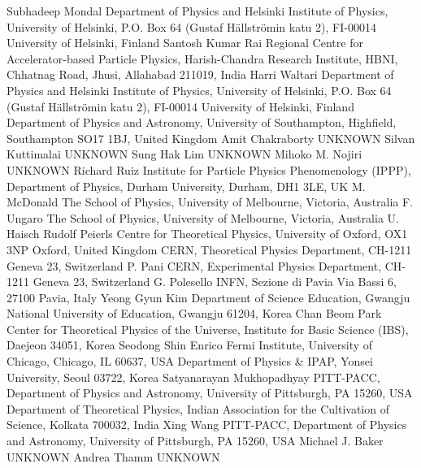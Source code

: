 Subhadeep Mondal {Department of Physics and Helsinki Institute of Physics, University of Helsinki, P.O. Box 64 (Gustaf H\"allstr\"omin katu 2), FI-00014 University of Helsinki, Finland}
Santosh Kumar Rai {Regional Centre for Accelerator-based Particle Physics, Harish-Chandra Research Institute, HBNI, Chhatnag Road, Jhusi, Allahabad 211019, India}
Harri Waltari {Department of Physics and Helsinki Institute of Physics, University of Helsinki, P.O. Box 64 (Gustaf H\"allstr\"omin katu 2), FI-00014 University of Helsinki, Finland} {Department of Physics and Astronomy, University of Southampton, Highfield, Southampton SO17 1BJ, United Kingdom}
Amit Chakraborty {UNKNOWN} 
Silvan Kuttimalai {UNKNOWN} 
Sung Hak Lim {UNKNOWN} 
Mihoko M. Nojiri {UNKNOWN}
Richard Ruiz {Institute for Particle Physics Phenomenology (IPPP), Department of Physics, Durham University, Durham, DH1 3LE, UK}
M. McDonald {The School of Physics, University of Melbourne, Victoria, Australia}
F. Ungaro {The School of Physics, University of Melbourne, Victoria, Australia}
U. Haisch {Rudolf Peierls Centre for Theoretical Physics, University of Oxford, OX1 3NP Oxford, United Kingdom} {CERN, Theoretical Physics Department, CH-1211 Geneva 23, Switzerland}
P. Pani {CERN, Experimental Physics Department, CH-1211 Geneva 23, Switzerland}
G. Polesello {INFN, Sezione di Pavia Via Bassi 6, 27100 Pavia, Italy}
Yeong Gyun Kim {Department of Science Education, Gwangju National University of Education, Gwangju 61204, Korea}
Chan Beom Park {Center for Theoretical Physics of the Universe, Institute for Basic Science (IBS), Daejeon 34051, Korea}
Seodong Shin {Enrico Fermi Institute, University of Chicago, Chicago, IL 60637, USA} {Department of Physics \& IPAP, Yonsei University, Seoul 03722, Korea}
Satyanarayan Mukhopadhyay {PITT-PACC, Department of Physics and Astronomy, University of Pittsburgh, PA 15260, USA} {Department of Theoretical Physics, Indian Association for the Cultivation of Science, Kolkata 700032, India}
Xing Wang {PITT-PACC, Department of Physics and Astronomy, University of Pittsburgh, PA 15260, USA}
Michael J. Baker {UNKNOWN}
Andrea Thamm {UNKNOWN}
